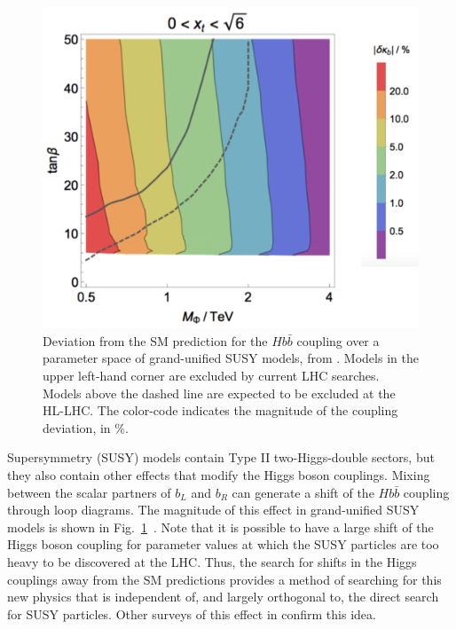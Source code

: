 \begin{figure}
\begin{center}
\includegraphics[width=0.90\hsize]{chapters/figures/WellsZhang.pdf}
\end{center}
\caption{Deviation from the SM prediction for the $Hb\bar b$ 
coupling over a parameter space of grand-unified SUSY models, from \cite{Wells:2017vla}.   
Models in the upper left-hand corner are excluded by current LHC searches.  
Models above the dashed line are expected to be excluded at the  HL-LHC. 
The color-code indicates the magnitude of the coupling deviation, in \%. }
\label{fig:WellsZhang}
\end{figure}


Supersymmetry (SUSY) models contain Type II  two-Higgs-double sectors, but they also contain other effects that modify the Higgs boson couplings.   Mixing between the scalar partners of $b_L$ and $b_R$ can generate a shift of the $Hb\bar b$ coupling through loop diagrams.  The magnitude of this effect in 
grand-unified SUSY models is shown in 
Fig.~\ref{fig:WellsZhang}~\cite{Wells:2017vla}.   
Note that it is possible to have a large shift of the Higgs boson coupling for 
parameter values at which the SUSY particles are too
heavy to be discovered at the LHC.   Thus, the search for shifts in the Higgs couplings away from the SM predictions provides a method of searching for this new physics that is independent of, and largely orthogonal to, the direct search for SUSY particles.   Other surveys of this effect in \cite{Cahill-Rowley:2014wba,Kanemura:2015mxa}  confirm this idea.

